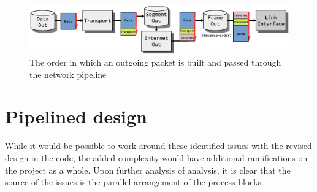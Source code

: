 \begin{figure}
    \centering
    \includegraphics[scale=0.45]{design/sending_packet_graph.eps}
    \caption{The order in which an outgoing packet is built and passed through the network pipeline}
    \label{fig:sending_packet_graph}
\end{figure}







\section{Pipelined design}
While it would be possible to work around these identified issues with the 
revised design in the code, the 
added complexity would have additional ramifications on the project as a whole.
Upon further analysis of analysis, it is clear that the source of the issues is 
the parallel arrangement of the process blocks.



